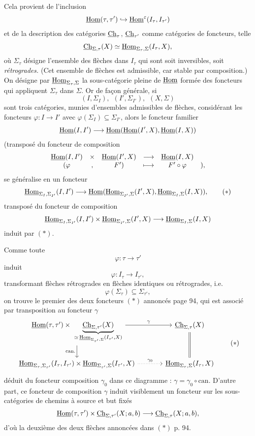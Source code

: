 Cela provient de l'inclusion
\[
\underline{\mathrm{Hom}}(\tau,\tau')\hookrightarrow\underline{\mathrm{Hom}}^{\varepsilon}(I_\tau,I_{\tau'})
\]
et de la description des catégories $\underline{\mathrm{Ch}}_\tau$, $\underline{\mathrm{Ch}}_{\tau'}$ comme catégories de foncteurs, telle
\[
\underline{\mathrm{Ch}}_{\Sigma,\tau}(X)\simeq\underline{\mathrm{Hom}}_{\Sigma_\tau,\Sigma}(I_\tau,X),
\]
où $\Sigma_\tau$ désigne l'ensemble des flèches dans $I_\tau$ qui sont soit inversibles, soit \textit{rétrogrades.} (Cet ensemble de flèches est admissible, car stable par composition.) On désigne par $\underline{\mathrm{Hom}}_{\Sigma_\tau,\Sigma}$ la sous-catégorie pleine de $\underline{\mathrm{Hom}}$ formée des foncteurs qui appliquent $\Sigma_\tau$ dans $\Sigma$. Or de façon générale, si
\[
(I,\Sigma_I),\ \ (I',\Sigma_{I'}),\ \ (X,\Sigma)
\]
sont trois catégories, munies d'ensembles admissibles de flèches, considérant les foncteurs $\varphi:I\longrightarrow I'$ avec $\varphi(\Sigma_I)\subseteq\Sigma_{I'}$, alors le foncteur familier
\[
\underline{\mathrm{Hom}}(I,I')\longrightarrow\underline{\mathrm{Hom}}(\underline{\mathrm{Hom}}(I',X),\underline{\mathrm{Hom}}(I,X))
\]
(transposé du foncteur de composition
\[
\begin{matrix}
\underline{\mathrm{Hom}}(I,I') & \times & \underline{\mathrm{Hom}}(I',X) & \longrightarrow & \underline{\mathrm{Hom}}(I,X) & \\
(\varphi & , & F') & \longmapsto & F'\circ\varphi & ),
\end{matrix}
\]
se généralise en un foncteur
\[
\uHom_{\Sigma_I,\Sigma_{I'}}(I,I')\longrightarrow\uHom(\uHom_{\Sigma_{I'},\Sigma}(I',X),\uHom_{\Sigma_I,\Sigma}(I,X)),
\tag*{$(*)$}
\]
transposé du foncteur de composition
\[
\underline{\mathrm{Hom}}_{\Sigma_I,\Sigma_{I'}}(I,I')\times\underline{\mathrm{Hom}}_{\Sigma_{I'},\Sigma}(I',X)\longrightarrow\underline{\mathrm{Hom}}_{\Sigma_I,\Sigma}(I,X)
\]
induit par $(*)$.


Comme toute
\[
\varphi:\tau\longrightarrow\tau'
\]
induit
\[
\varphi:I_\tau\longrightarrow I_{\tau'},
\]
transformant flèches rétrogrades en flèches identiques ou rétrogrades, i.e.
\[
\varphi(\Sigma_\tau)\subseteq\Sigma_{\tau'},
\]
on trouve le premier des deux foncteurs $(*)$ annoncés page 94, qui est associé par transposition au foncteur $\gamma$
\[
\begin{tikzcd}[column sep=large]
\uHom(\tau,\tau')\times\ \underbrace{\uCh_{\Sigma,\tau'}(X)}_{\simeq\,\uHom_{\Sigma_{\tau'},\Sigma}(I_{\tau'},X)} \arrow[r, "\gamma"] \arrow[d, "\text{can.}"'] & \uCh_{\Sigma,\tau}(X) \arrow[d, equal]\\
\uHom_{\Sigma_\tau,\Sigma_{\tau'}}(I_\tau,I_{\tau'})\times\uHom_{\Sigma_{\tau'},\Sigma}(I_{\tau'},X) \arrow[r, dotted, "\gamma_0"] & \uHom_{\Sigma_\tau,\Sigma}(I_\tau,X)
\end{tikzcd}
\tag*{$(*)$}
\]
déduit du foncteur composition $\gamma_0$ dans ce diagramme : $\gamma=\gamma_0\circ\mathrm{can}.$ D'autre part, ce foncteur de composition $\gamma$ induit visiblement un foncteur sur les sous-catégories de chemins à source et but fixés
\[
\underline{\mathrm{Hom}}(\tau,\tau')\times\underline{\mathrm{Ch}}_{\Sigma,\tau'}(X;a,b)\longrightarrow\underline{\mathrm{Ch}}_{\Sigma,\tau}(X;a,b),
\]
d'où la deuxième des deux flèches annoncées dans $(*)$ p. 94.

